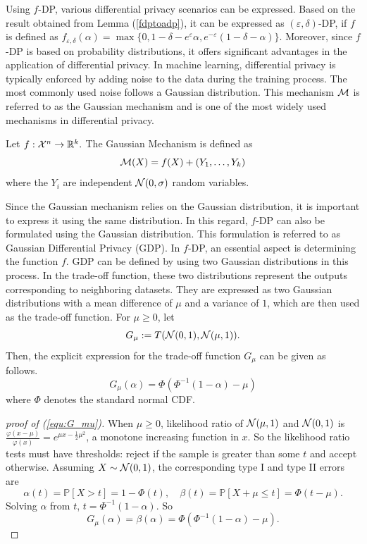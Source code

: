 \documentclass{article}
\begin{document}
Using $f$-DP, various differential privacy scenarios can be expressed. Based on the result obtained from Lemma (\ref{fdptoadp}), it can be expressed as $(\varepsilon,\delta)$-DP, if $f$ is defined as $f_{\varepsilon,\delta}(\alpha) = \max\{0, 1-\delta-e^\varepsilon\alpha, e^{-\varepsilon} (1-\delta-\alpha)\}$.  
Moreover, since $f$-DP is based on probability distributions, it offers significant advantages in the application of differential privacy. In machine learning, differential privacy is typically enforced by adding noise to the data during the training process. The most commonly used noise follows a Gaussian distribution. This mechanism ${\mathcal{M}}$ is referred to as the Gaussian mechanism and is one of the most widely used mechanisms in differential privacy.

\begin{definition}
    Let $f: {\mathcal{X}}^n \to \mathbb{R}^k.$ The Gaussian Mechanism is defined as
    \begin{equation*}
        {\mathcal{M}}(X) = f(X) + (Y_1, \dots,Y_k)
    \end{equation*}
    where the $Y_i$ are independent ${\mathcal{N}}(0,\sigma)$ random variables.
\end{definition}
Since the Gaussian mechanism relies on the Gaussian distribution, it is important to express it using the same distribution. In this regard, $f$-DP can also be formulated using the Gaussian distribution. This formulation is referred to as Gaussian Differential Privacy (GDP). In $f$-DP, an essential aspect is determining the function $f$. GDP can be defined by using two Gaussian distributions in this process. In the trade-off function, these two distributions represent the outputs corresponding to neighboring datasets. They are expressed as two Gaussian distributions with a mean difference of $\mu$ and a variance of $1$, which are then used as the trade-off function. For $\mu \ge 0$, let
\begin{equation*}
    G_\mu := T({\mathcal{N}}(0,1),{\mathcal{N}}(\mu,1)).
\end{equation*}
Then, the explicit expression for the trade-off function $G_\mu$ can be given as follows.
\begin{equation}\label{equ:G_mu}
    G_\mu(\alpha) = \Phi(\Phi^{-1}(1-\alpha)-\mu)
\end{equation}
where $\Phi$ denotes the standard normal CDF.
\begin{proof}[proof of (\ref{equ:G_mu})]
When $\mu \ge 0$, likelihood ratio of ${\mathcal{N}}(\mu,1)$ and ${\mathcal{N}}(0,1)$ is $\frac{\varphi(x-\mu)}{\varphi(x)} = e^{\mu x- \frac{1}{2}\mu^2}$, a monotone increasing function in $x$. So the likelihood ratio tests must have thresholds: reject if the sample is greater than some $t$ and accept otherwise. Assuming $X \sim {\mathcal{N}}(0,1)$, the corresponding type I and type II errors are
\begin{equation*}
    \alpha(t) = \mathbb{P}[X > t]= 1-\Phi(t), \quad \beta(t) = \mathbb{P}[X+\mu \le t] = \Phi(t-\mu).
\end{equation*}
Solving $\alpha$ from $t$, $t=\Phi^{-1}(1-\alpha)$. So 
\begin{equation*}
    G_\mu(\alpha) = \beta(\alpha) = \Phi(\Phi^{-1}(1-\alpha)-\mu).
\end{equation*}
\end{proof}
\end{document}
